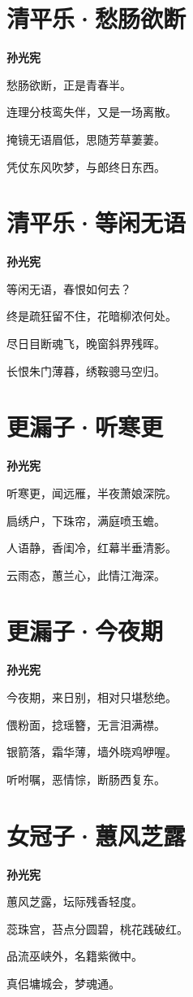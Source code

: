 \documentclass[12pt,a4paper]{ctexbook}
\begin{document}
\section{清平乐·愁肠欲断}
\textbf{孙光宪}\par\vspace{0.5em}
愁肠欲断，正是青春半。\par
连理分枝鸾失伴，又是一场离散。\par
掩镜无语眉低，思随芳草萋萋。\par
凭仗东风吹梦，与郎终日东西。\par

\section{清平乐·等闲无语}
\textbf{孙光宪}\par\vspace{0.5em}
等闲无语，春恨如何去？\par
终是疏狂留不住，花暗柳浓何处。\par
尽日目断魂飞，晚窗斜界残晖。\par
长恨朱门薄暮，绣鞍骢马空归。\par

\section{更漏子·听寒更}
\textbf{孙光宪}\par\vspace{0.5em}
听寒更，闻远雁，半夜萧娘深院。\par
扃绣户，下珠帘，满庭喷玉蟾。\par
人语静，香闺冷，红幕半垂清影。\par
云雨态，蕙兰心，此情江海深。\par

\section{更漏子·今夜期}
\textbf{孙光宪}\par\vspace{0.5em}
今夜期，来日别，相对只堪愁绝。\par
偎粉面，捻瑶簪，无言泪满襟。\par
银箭落，霜华薄，墙外晓鸡咿喔。\par
听咐嘱，恶情悰，断肠西复东。\par

\section{女冠子·蕙风芝露}
\textbf{孙光宪}\par\vspace{0.5em}
蕙风芝露，坛际残香轻度。\par
蕊珠宫，苔点分圆碧，桃花践破红。\par
品流巫峡外，名籍紫微中。\par
真侣墉城会，梦魂通。\par
\end{document}
